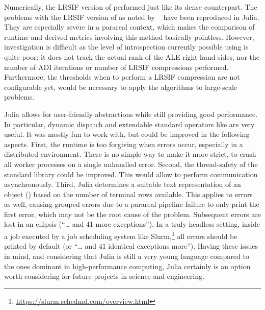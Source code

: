 Numerically, the \ac{LRSIF} version of  performed just like its dense counterpart.
The problems with the \ac{LRSIF} version of  as noted by \citeauthor*{Lang2015}~\cite{Lang2015,Lang2017} have been reproduced in Julia.
They are especially severe in a parareal context,
which makes the comparison of runtime and derived metrics involving this method basically pointless.
However, investigation is difficult as the level of introspection
currently possible using  is quite poor:
it does not track the actual rank of the \ac{ALE} right-hand sides,
nor the number of \ac{ADI} iterations or number of \ac{LRSIF} compressions performed.
Furthermore, the thresholds when to perform a \ac{LRSIF} compression are not configurable yet,
would be necessary to apply the algorithms to large-scale problems.

Julia allows for user-friendly abstractions while still providing good performance.
In particular, dynamic dispatch and extendable standard operators like \julia{(+)} are very useful.
It was mostly fun to work with, but could be improved in the following aspects.
First, the runtime is too forgiving when errors occur,
especially in a distributed environment.
There is no simple way to make it more strict, \eg to crash all worker processes on a single unhandled error.
Second, the thread-safety of the standard library could be improved.
This would allow  to perform communication asynchronously.
Third, Julia determines a suitable text representation of an object (\eg {}) based on the number of terminal rows available.
This applies to errors as well, causing \eg grouped errors due to a parareal pipeline failure to only print the first error,
which may not be the root cause of the problem.
Subsequent errors are lost in an ellipsis (\enquote{\ldots{} and 41 more exceptions}).
In a truly headless setting,
\eg inside a job executed by a job scheduling system like Slurm,\footnote{\url{https://slurm.schedmd.com/overview.html}}
all errors should be printed by default (or \enquote{\ldots{} and 41 identical exceptions more}).
Having these issues in mind,
and considering that Julia is still a very young language compared to the ones dominant in high-performance computing,
Julia certainly is an option worth considering for future projects in science and engineering.
